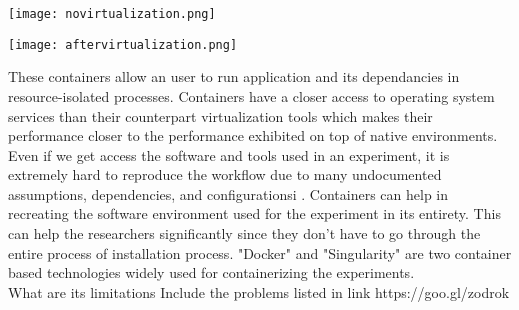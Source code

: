 \begin{center}
\begin{minipage}{0.48\linewidth}
\texttt{[image: novirtualization.png]}
\label{fig:novirtualization}
\end{minipage}%
\hfill
\begin{minipage}{0.48\linewidth}
\texttt{[image: aftervirtualization.png]}
\label{fig:aftervirtualization}
\end{minipage}
\end{center}

These containers allow an user to run application and its dependancies in resource-isolated processes. Containers have a closer access to operating system services than their counterpart virtualization tools which makes their performance closer to the performance exhibited on top of native environments\cite{Xavier:2013:PEC:2497369.2497577}.\\

Even if we get access the software and tools used in an experiment, it is extremely hard to reproduce the workflow due to many undocumented assumptions, dependencies, and configurationsi \cite{7883438}. Containers can help in recreating the software environment used for the experiment in its entirety. This can help the researchers significantly since they don't have to go through the entire process of installation process. "Docker" and "Singularity" are two container based technologies widely used for containerizing the experiments.\\


What are its limitations
Include the problems listed in link https://goo.gl/zodrok

